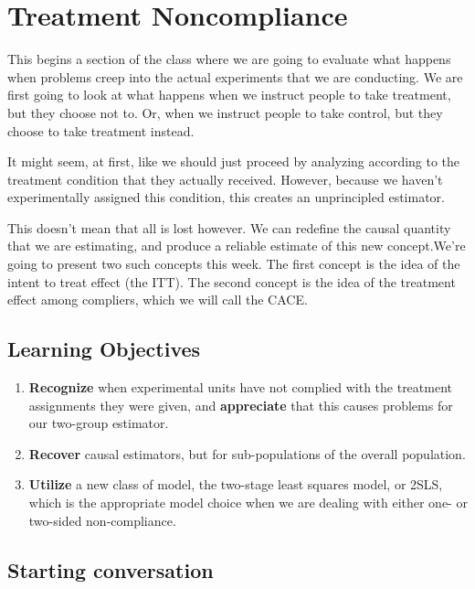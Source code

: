 \documentclass[
]{book}
\providecommand{\tightlist}{%
  \setlength{\itemsep}{0pt}\setlength{\parskip}{0pt}}
\begin{document}
\hypertarget{treatment-noncompliance}{%
\chapter{Treatment Noncompliance}\label{treatment-noncompliance}}

This begins a section of the class where we are going to evaluate what
happens when problems creep into the actual experiments that we are
conducting. We are first going to look at what happens when we instruct
people to take treatment, but they choose not to. Or, when we instruct
people to take control, but they choose to take treatment instead.

It might seem, at first, like we should just proceed by analyzing
according to the treatment condition that they actually received.
However, because we haven't experimentally assigned this condition, this
creates an unprincipled estimator.

This doesn't mean that all is lost however. We can redefine the causal
quantity that we are estimating, and produce a reliable estimate of this
new concept.We're going to present two such concepts this week. The
first concept is the idea of the intent to treat effect (the ITT). The
second concept is the idea of the treatment effect among compliers,
which we will call the CACE.

\hypertarget{learning-objectives-7}{%
\section{Learning Objectives}\label{learning-objectives-7}}

\begin{enumerate}
\def\labelenumi{\arabic{enumi}.}
\tightlist
\item
  \textbf{Recognize} when experimental units have not complied with the
  treatment assignments they were given, and \textbf{appreciate} that
  this causes problems for our two-group estimator.
\item
  \textbf{Recover} causal estimators, but for sub-populations of the
  overall population.
\item
  \textbf{Utilize} a new class of model, the two-stage least squares
  model, or 2SLS, which is the appropriate model choice when we are
  dealing with either one- or two-sided non-compliance.
\end{enumerate}

\hypertarget{starting-conversation}{%
\section{Starting conversation}\label{starting-conversation}}
\end{document}
